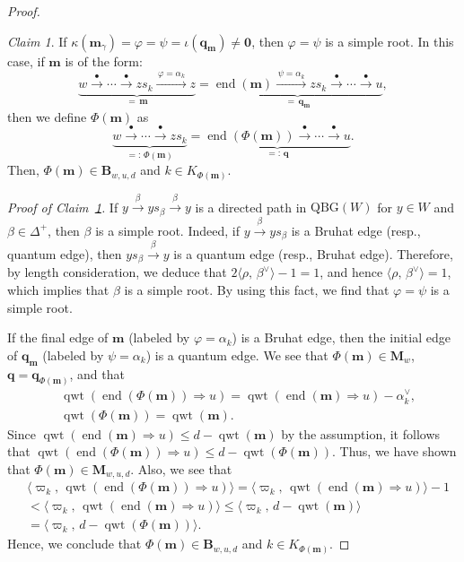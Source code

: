 \documentclass[11pt,a4paper,reqno,dvipdfmx]{amsart}
\numberwithin{equation}{section}
\newcommand{\vp}{\varphi}
\newcommand{\vpi}{\varpi}
\newcommand{\bm}{\mathbf{m}}
\newcommand{\bq}{\mathbf{q}}
\newcommand{\bB}{\mathbf{B}}
\newcommand{\bM}{\mathbf{M}}
\newcommand{\bzero}{\mathbf{0}}
\DeclareMathOperator{\qwt}{qwt}
\DeclareMathOperator{\ed}{end}
\newcommand{\QBG}{\mathrm{QBG}}
\newcommand{\edge}[1]{ \xrightarrow{\hspace{2pt}#1\hspace{2pt}} }
\newcommand{\pair}[2]{\langle #1,\,#2 \rangle}
\theoremstyle{plain}
\theoremstyle{definition}
\theoremstyle{remark}
\newtheorem{claim}{Claim}[lem]
\begin{document}
\begin{proof}
\medskip

\begin{claim} \label{c:3ptb}
If $\kappa(\bm_{\gamma}) = \vp = \psi = \iota(\bq_{\bm}) \ne \bzero$, 
then $\vp=\psi$ is a simple root. In this case, 
if $\bm$ is of the form: 
%
\begin{equation*}
\underbrace{w \edge{\bullet} \cdots \edge{\bullet} zs_{k} \edge{\vp = \alpha_{k}} z}_{= \, \bm} = 
\underbrace{\ed(\bm) \edge{\psi = \alpha_{k}} zs_{k} \edge{\bullet} \cdots \edge{\bullet} u}_{= \, \bq_{\bm}}, 
\end{equation*}
%
then we define $\Phi(\bm)$ as 
%
\begin{equation*}
\underbrace{w \edge{\bullet} \cdots \edge{\bullet} zs_{k}}_{=: \, \Phi(\bm)} = 
\underbrace{\ed(\Phi(\bm)) \edge{\bullet} \cdots \edge{\bullet} u}_{=: \, \bq}. 
\end{equation*}
%
Then, $\Phi(\bm) \in \bB_{w,u,d}$ and $k \in K_{\Phi(\bm)}$. 
\end{claim}

\noindent
{\it Proof of Claim~\ref{c:3ptb}.}
If $y \edge{\beta} ys_{\beta} \edge{\beta} y$ is a directed path in $\QBG(W)$ 
for $y \in W$ and $\beta \in \Delta^{+}$, 
then $\beta$ is a simple root. Indeed, if $y \edge{\beta} ys_{\beta}$ is a Bruhat edge 
(resp., quantum edge), then $ys_{\beta} \edge{\beta} y$ is a quantum edge (resp., Bruhat edge). 
Therefore, by length consideration, we deduce that $2\pair{\rho}{\beta^{\vee}} - 1 = 1$, 
and hence $\pair{\rho}{\beta^{\vee}} = 1$, which implies that $\beta$ is a simple root. 
By using this fact, we find that $\vp=\psi$ is a simple root.

If the final edge of $\bm$ (labeled by $\vp=\alpha_{k}$) is a Bruhat edge, 
then the initial edge of $\bq_{\bm}$ (labeled by $\psi = \alpha_{k}$) is a quantum edge. 
We see that $\Phi(\bm) \in \bM_{w}$, $\bq=\bq_{\Phi(\bm)}$, and that 
%
\begin{equation*}
%
\begin{split}
& \qwt(\ed(\Phi(\bm)) \Rightarrow u) = 
  \qwt(\ed(\bm) \Rightarrow u) - \alpha_{k}^{\vee}, \\
& \qwt(\Phi(\bm)) = \qwt(\bm). 
\end{split}
%
\end{equation*}
%
Since $\qwt(\ed(\bm) \Rightarrow u) \le d - \qwt(\bm)$ by the assumption, 
it follows that $\qwt(\ed(\Phi(\bm)) \Rightarrow u) \le d - \qwt(\Phi(\bm))$. 
Thus, we have shown that $\Phi(\bm) \in \bM_{w,u,d}$. Also, we see that 
%
\begin{align*}
& \pair{\vpi_{k}}{\qwt(\ed(\Phi(\bm)) \Rightarrow u)} = 
  \pair{\vpi_{k}}{\qwt(\ed(\bm) \Rightarrow u)} - 1 \\ 
& < \pair{\vpi_{k}}{\qwt(\ed(\bm) \Rightarrow u)} \le \pair{\vpi_{k}}{d - \qwt(\bm)} \\
& = \pair{\vpi_{k}}{d - \qwt(\Phi(\bm))}.
\end{align*}
%
Hence, we conclude that $\Phi(\bm) \in \bB_{w,u,d}$ and $k \in K_{\Phi(\bm)}$. 


\end{proof}
\end{document}

